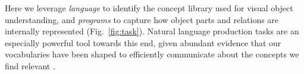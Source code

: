 \documentclass[10pt,letterpaper]{article}
\newcommand{\jda}[1]{{\color{blue}[jda: #1]}}
\begin{document}


Here we leverage \textit{language} to identify the concept library used for visual object understanding, and \textit{programs} to capture how object parts and relations are internally represented (Fig.~\ref{fig:task}).
Natural language production tasks are an especially powerful tool towards this end, given abundant evidence that our vocabularies have been shaped to efficiently communicate about the concepts we find relevant .
\end{document}
